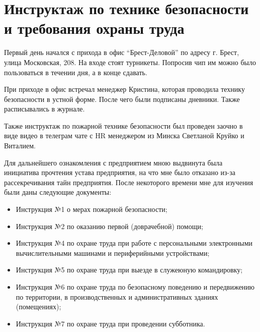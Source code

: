 \newpage
\section{Инструктаж по технике безопасности и требования охраны труда}

Первый день начался с прихода в офис “Брест-Деловой” по адресу г. Брест, улица Московская, 208. На входе стоят турникеты. Попросив чип им можно было пользоваться в течении дня, а в конце сдавать.

При приходе в офис встречал менеджер Кристина, которая проводила технику безопасности в устной форме. После чего были подписаны дневники. Также расписывались в журнале.

Также инструктаж по пожарной технике безопасности был проведен заочно в виде видео в телеграм чате с HR менеджером из Минска Светланой Круйко и Виталием.

Для дальнейшего ознакомления с предприятием мною выдвинута была инициатива прочтения устава предприятия, на что мне было отказано из-за рассекречивания тайн предприятия. После некоторого времени мне для изучения были даны следующие документы:

\begin{itemize}
  \item Инструкция №1 о мерах пожарной безопасности;
  \item Инструкция №2 по оказанию первой (доврачебной) помощи;
  \item Инструкция №4 по охране труда при работе с персональными электронными вычислительными машинами и периферийными устройствами;
  \item Инструкция №5 по охране труда при выезде в служеюную командировку;
  \item Инструкция №6 по охране труда по безопасному поведению и передвижению по территории, в производственных и административных зданиях (помещениях);
  \item Инструкция №7 по охране труда при проведении субботника.
\end{itemize}
